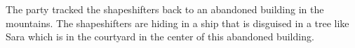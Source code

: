 The party tracked the shapeshifters back to an abandoned building in the mountains.
The shapeshifters are hiding in a ship that is disguised in a tree like Sara which is in the courtyard in the center of this abandoned building.
